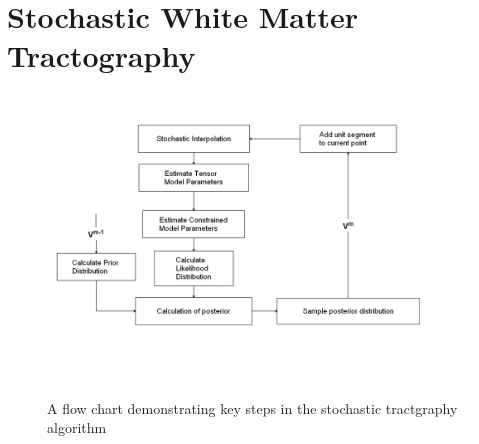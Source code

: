 \chapter{Stochastic White Matter Tractography}
\begin{figure} \label{fig:stflow}
	\includegraphics[width=0.5\linewidth]{stflow}
	\caption{A flow chart demonstrating key steps in the stochastic tractgraphy algorithm}
\end{figure}

